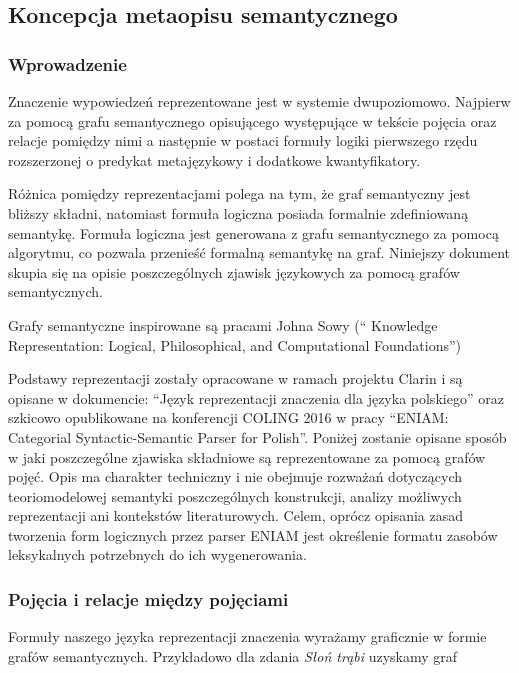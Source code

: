 \documentclass[12pt]{mwart}
\theoremstyle{remark}
\begin{document}
\subsection{Koncepcja metaopisu semantycznego}


\subsubsection{Wprowadzenie}

Znaczenie wypowiedzeń reprezentowane jest w systemie dwupoziomowo.
Najpierw za pomocą grafu semantycznego opisującego występujące w tekście pojęcia
oraz relacje pomiędzy nimi a następnie w postaci formuły logiki pierwszego rzędu
rozszerzonej o predykat metajęzykowy i dodatkowe kwantyfikatory.

Różnica pomiędzy reprezentacjami polega na tym, że
graf semantyczny jest bliższy składni, natomiast formuła logiczna posiada formalnie zdefiniowaną semantykę.
Formuła logiczna jest generowana z grafu semantycznego za pomocą algorytmu, co pozwala przenieść
formalną semantykę na graf. Niniejszy dokument skupia się na opisie poszczególnych zjawisk językowych za pomocą grafów semantycznych.

Grafy semantyczne inspirowane są pracami Johna Sowy (`` Knowledge Representation:
Logical, Philosophical, and Computational Foundations'')

Podstawy reprezentacji zostały opracowane w ramach projektu Clarin i
są opisane w dokumencie: ``Język reprezentacji znaczenia dla języka
polskiego'' oraz szkicowo opublikowane na konferencji COLING 2016 w 
pracy ``ENIAM: Categorial Syntactic-Semantic Parser for Polish''.
Poniżej zostanie opisane sposób w jaki poszczególne zjawiska składniowe 
są reprezentowane za pomocą grafów pojęć. Opis ma charakter techniczny 
i nie obejmuje rozważań dotyczących teoriomodelowej semantyki poszczególnych konstrukcji, 
analizy możliwych reprezentacji ani kontekstów literaturowych. 
Celem, oprócz opisania zasad tworzenia form logicznych przez parser ENIAM
jest określenie formatu zasobów leksykalnych potrzebnych do ich wygenerowania.

\subsubsection{Pojęcia i relacje między pojęciami}
Formuły naszego języka reprezentacji znaczenia wyrażamy graficznie
w formie grafów semantycznych. %
Przykładowo dla zdania {\it Słoń trąbi} uzyskamy graf 
\end{document}
